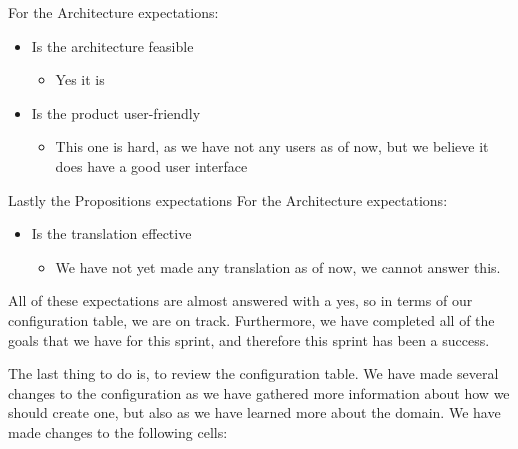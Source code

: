 For the Architecture expectations:
\begin{itemize}
    \item Is the architecture feasible
    \begin{itemize}
        \item Yes it is
    \end{itemize}
    \item Is the product user-friendly
    \begin{itemize}
        \item This one is hard, as we have not any users as of now, but we believe it does have a good user interface
    \end{itemize}
\end{itemize}

Lastly the Propositions expectations
For the Architecture expectations:
\begin{itemize}
    \item Is the translation effective
    \begin{itemize}
        \item We have not yet made any translation as of now, we cannot answer this.
    \end{itemize}
\end{itemize}

All of these expectations are almost answered with a yes, so in terms of our configuration table, we are on track.
Furthermore, we have completed all of the goals that we have for this sprint, and therefore this sprint has been a success.

The last thing to do is, to review the configuration table.
We have made several changes to the configuration as we have gathered more information about how we should create one, but also as we have learned more about the domain.
We have made changes to the following cells:

